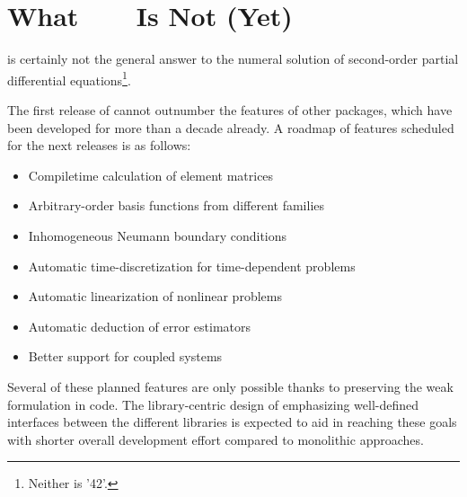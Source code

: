 \section*{What\ \ {\ViennaFEM}\ \ Is Not (Yet)}
{\ViennaFEM} is certainly not the general answer to the numeral solution of second-order partial differential equations\footnote{Neither is '42'.}.

The first release of {\ViennaFEM} cannot outnumber the features of other packages, which have been developed for more than a decade already.
A roadmap of features scheduled for the next releases is as follows:
\begin{itemize}
 \item Compiletime calculation of element matrices
 \item Arbitrary-order basis functions from different families
 \item Inhomogeneous Neumann boundary conditions
 \item Automatic time-discretization for time-dependent problems 
 \item Automatic linearization of nonlinear problems
 \item Automatic deduction of error estimators
 \item Better support for coupled systems
\end{itemize}
Several of these planned features are only possible thanks to preserving the weak formulation in code.
The library-centric design of {\ViennaFEM} emphasizing well-defined interfaces between the different libraries is expected to aid in reaching these goals with shorter overall development effort compared to monolithic approaches.
